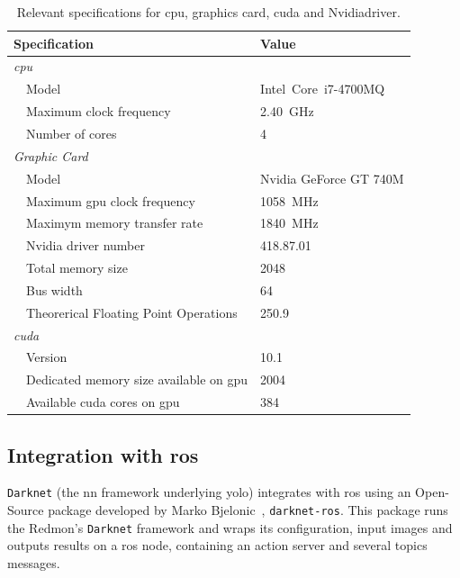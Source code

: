 \begin{table}[H]
	\renewcommand{\arraystretch}{1.2}
	\centering
	\begin{tabular}{@{}lp{7cm}l@{}}
		\toprule
		\multicolumn{2}{l}{Specification} & Value \\ \midrule
		\multicolumn{2}{l}{\emph{\ac{cpu}}} & \\
		\phantom{a} & Model   & Intel\cp~Core\texttrademark~i7-4700MQ \\
								& Maximum clock frequency & \SI{2.40}{\giga\hertz} \\
								& Number of cores & 4 \\ 
		\midrule
		\multicolumn{2}{l}{\emph{Graphic Card}} & \\
		\phantom{a} & Model   & Nvidia GeForce GT 740M \\
								& Maximum \ac{gpu} clock frequency & \SI{1058}{\mega\hertz} \\
								&	Maximym memory transfer rate & \SI{1840}{\mega\hertz} \\
								&	Nvidia driver number & 418.87.01 \\
								& Total memory size & \SI{2048}{\mega\byte} \\
								& Bus width & \SI{64}{\bytes} \\
								& Theorerical Floating Point Operations & \SI{250.9}{\giga\flops} \\
		\midrule 
		\multicolumn{2}{l}{\emph{\ac{cuda}\texttrademark}} \\
								&	Version & 10.1 \\
								&	Dedicated memory size available on \ac{gpu}& \SI{2004}{\mega\byte} \\
								& Available \ac{cuda} cores on \ac{gpu} & 384 \\
		\bottomrule
	\end{tabular}
	\caption{Relevant specifications for \ac{cpu}, graphics card, \ac{cuda} and Nvidia\texttrademark driver.}
	\label{tab:computer-specs}
\end{table}


\subsection{Integration with \ac{ros}}
\texttt{Darknet} (the \ac{nn} framework underlying \ac{yolo}) integrates with \ac{ros} using an Open-Source package developed by Marko Bjelonic~\cite{MarkoBjelonic}, \texttt{darknet-ros}. This package runs the Redmon's \texttt{Darknet} framework and wraps its configuration, input images and outputs results on a \ac{ros} node, containing an action server and several topics messages.

